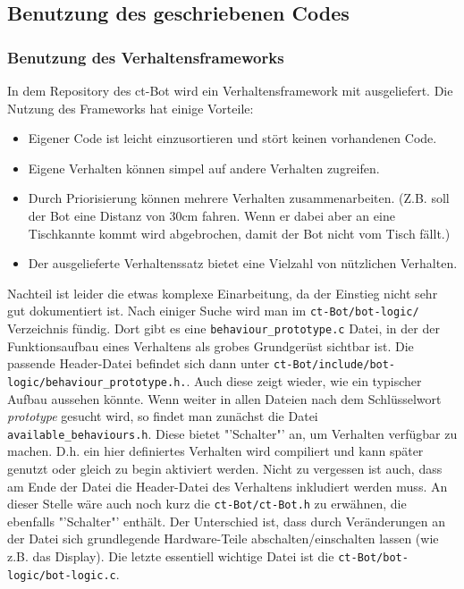\subsection{Benutzung des geschriebenen Codes}
\label{benutzung}
\subsubsection{Benutzung des Verhaltensframeworks}
\label{benutzung_verhaltensframework}
In dem Repository des ct-Bot wird ein Verhaltensframework mit ausgeliefert.
Die Nutzung des Frameworks hat einige Vorteile:
\begin{itemize}
	\item Eigener Code ist leicht einzusortieren und stört keinen vorhandenen Code.
	\item Eigene Verhalten können simpel auf andere Verhalten zugreifen.
	\item Durch Priorisierung können mehrere Verhalten zusammenarbeiten.
		(Z.B. soll der Bot eine Distanz von 30cm fahren. Wenn er dabei aber an eine
		Tischkannte kommt wird abgebrochen, damit der Bot nicht vom Tisch fällt.)
	\item Der ausgelieferte Verhaltenssatz bietet eine Vielzahl von nützlichen
		Verhalten.
\end{itemize}
Nachteil ist leider die etwas komplexe Einarbeitung, da der Einstieg nicht sehr gut
dokumentiert ist. Nach einiger Suche wird man im \verb+ct-Bot/bot-logic/+ 
Verzeichnis fündig. Dort gibt es eine \verb+behaviour_prototype.c+ Datei,
in der der Funktionsaufbau eines Verhaltens als grobes Grundgerüst sichtbar ist.
Die passende Header-Datei befindet sich dann unter
\verb+ct-Bot/include/bot-logic/behaviour_prototype.h.+. Auch diese
zeigt wieder, wie ein typischer Aufbau aussehen könnte. Wenn weiter in allen Dateien
nach dem Schlüsselwort \textit{prototype} gesucht wird, so findet man zunächst
die Datei \\ \verb+available_behaviours.h+. Diese bietet "'Schalter"'
an, um Verhalten verfügbar zu machen. D.h. ein hier definiertes Verhalten
wird compiliert und kann später genutzt oder gleich zu begin aktiviert werden.
Nicht zu vergessen ist auch, dass am Ende der Datei die Header-Datei des
Verhaltens inkludiert werden muss. An dieser Stelle wäre auch noch kurz die
\verb+ct-Bot/ct-Bot.h+ zu erwähnen, die ebenfalls "'Schalter"' enthält.
Der Unterschied ist, dass durch Veränderungen an der Datei sich grundlegende
Hardware-Teile abschalten/einschalten lassen (wie z.B. das Display).
Die letzte essentiell wichtige Datei ist die \verb+ct-Bot/bot-logic/bot-logic.c+.

